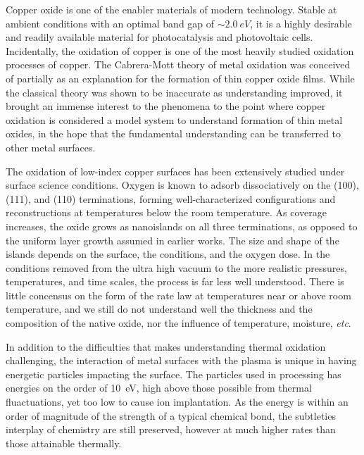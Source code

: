 \documentclass[manuscript=cmatex]{achemso}
\begin{document}
Copper oxide is one of the enabler materials of modern technology. Stable at ambient conditions with an optimal band gap of $\sim \SI{2.0}{eV}$, it is a highly desirable and readily available material for photocatalysis and photovoltaic cells. Incidentally, the oxidation of copper is one of the most heavily studied oxidation processes of copper. The Cabrera-Mott theory of metal oxidation was conceived of partially as an explanation for the formation of thin copper oxide films. While the classical theory was shown to be inaccurate as understanding improved, it brought an immense interest to the phenomena to the point where copper oxidation is considered a model system to understand formation of thin metal oxides, in the hope that the fundamental understanding can be transferred to other metal surfaces.\cite{gattinoni_atomistic_2015}

The oxidation of low-index copper surfaces has been extensively studied under surface science conditions. Oxygen is known to adsorb dissociatively on the (100), (111), and (110) terminations, forming well-characterized configurations and reconstructions at temperatures below the room temperature. As coverage increases, the oxide grows as nanoislands on all three terminations, as opposed to the uniform layer growth assumed in earlier works. The size and shape of the islands depends on the surface, the conditions, and the oxygen dose. In the conditions removed from the ultra high vacuum to the more realistic pressures, temperatures, and time scales, the process is far less well understood. There is little concensus on the form of the rate law at temperatures near or above room temperature, and we still do not understand well the thickness and the composition of the native oxide, nor the influence of temperature, moisture, \textit{etc}.

In addition to the difficulties that makes understanding thermal oxidation challenging, the interaction of metal surfaces with the plasma is unique in having energetic particles impacting the surface. The particles used in processing has energies on the order of \SI{10}{eV}, high above those possible from thermal fluactuations, yet too low to cause ion implantation. As the energy is within an order of magnitude of the strength of a typical chemical bond, the subtleties interplay of chemistry are still preserved, however at much higher rates than those attainable thermally. 
\end{document}
